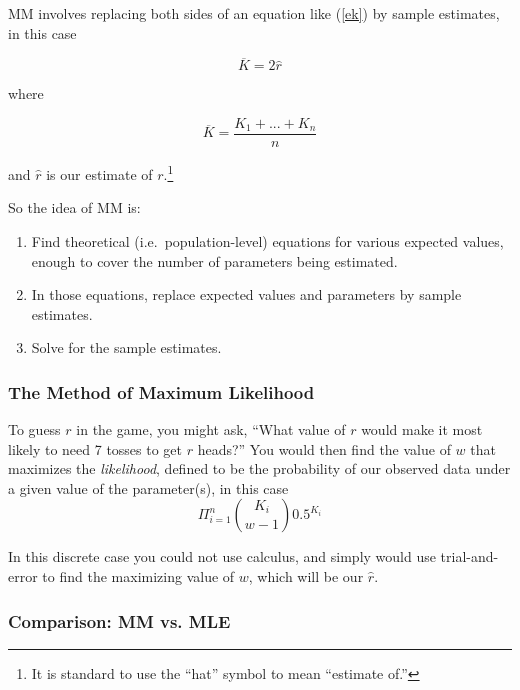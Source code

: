 MM involves replacing both sides of an equation like (\ref{ek}) by
sample estimates, in this case

\begin{equation}
\overline{K} = 2 \widehat{r}
\end{equation}

where 

\begin{equation}
\overline{K} = \frac{K_1+...+K_n}{n}
\end{equation}

and $\widehat{r}$ is our estimate of $r$.\footnote{It is standard to use
the ``hat'' symbol to mean ``estimate of.''}

So the idea of MM is:

\begin{enumerate}

\item Find theoretical (i.e.\ population-level) equations for various
expected values, enough to cover the number of parameters being
estimated.

\item In those equations, replace expected values and parameters
by sample estimates.

\item Solve for the sample estimates.

\end{enumerate}

\subsubsection{The Method of Maximum Likelihood}

To guess $r$ in the game, you might ask, ``What value of $r$ would make
it most likely to need 7 tosses to get $r$ heads?''  You would then find
the value of $w$ that maximizes the \textit{likelihood}, defined to be
the probability of our observed data under a given value of the
parameter(s), in this case
\begin{equation}
\Pi_{i=1}^n
\binom{K_i}{w-1} 0.5^{K_i}
\end{equation}

In this discrete case you could not use calculus, and simply would use
trial-and-error to find the maximizing value of $w$, which will be our
$\widehat{r}$.

\subsubsection{Comparison:  MM vs. MLE}

